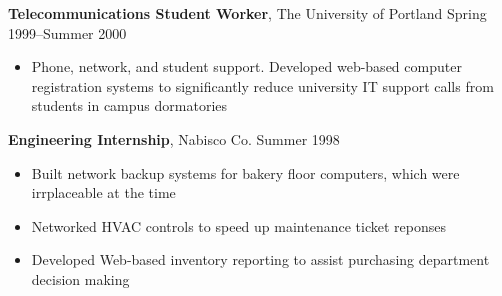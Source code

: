 {\bf Telecommunications Student Worker}, The University of Portland \hfill Spring 1999--Summer 2000
\begin{itemize}
	\item Phone, network, and student support.  Developed web-based computer registration systems to significantly reduce university IT support calls from students in campus dormatories
\end{itemize}

{\bf Engineering Internship}, Nabisco Co. \hfill Summer 1998
\begin{itemize}
	\item Built network backup systems for bakery floor computers, which were irrplaceable at the time
    \item Networked HVAC controls to speed up maintenance ticket reponses
    \item Developed Web-based inventory reporting to assist purchasing department decision making
\end{itemize}
